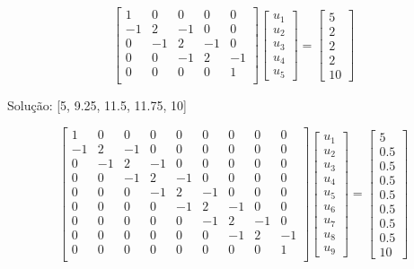 \begin{Answer}
\begin{tiny} 
 $$\left[
  \begin{array}{ccccc}
         1 & 0& 0& 0& 0\\
         -1 & 2 & -1 &0&0\\
         0&-1 & 2 & -1 &0\\
         0&0&-1 & 2 & -1 \\
         0 & 0& 0& 0& 1\\
        \end{array}
\right]
\left[
  \begin{array}{c}
     u_1\\ u_2\\u_3\\u_4 \\ u_5
   \end{array}
\right]
=
\left[
  \begin{array}{c}
     5\\ 2\\2\\2 \\ 10
   \end{array}
\right]
$$


Solução:  [5, 9.25, 11.5, 11.75, 10]    

$$\left[
  \begin{array}{ccccccccc}
         1 & 0& 0& 0& 0& 0& 0& 0& 0\\
         -1 & 2 & -1 &0&0& 0& 0& 0& 0\\
         0&-1 & 2 & -1 &0& 0& 0& 0& 0\\
         0&0&-1 & 2 & -1 & 0& 0& 0& 0\\
         0&0&0&-1 & 2 & -1 & 0& 0& 0\\
         0&0&0&0&-1 & 2 & -1 & 0& 0\\
         0&0&0&0&0&-1 & 2 & -1 & 0\\
         0&0&0&0&0&0&-1 & 2 & -1\\
         0 & 0& 0& 0& 0& 0& 0& 0& 1\\
        \end{array}
\right]
\left[
  \begin{array}{c}
     u_1\\ u_2\\u_3\\u_4 \\u_5\\ u_6\\u_7\\u_8\\u_9
   \end{array}
\right]
=
\left[
  \begin{array}{c}
     5\\ 0.5\\0.5\\0.5\\ 0.5\\0.5\\0.5\\0.5 \\ 10
   \end{array}
\right]
$$


\end{tiny}
\end{Answer}
